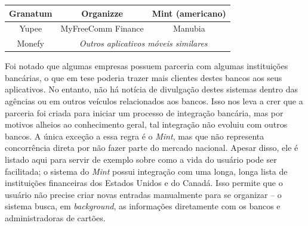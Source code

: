 \documentclass[a4paper]{abnt}
\begin{document}
\begin{center}
	\begin{tabular}{|c|c|c|}
		\hline 
		\textbf{Granatum} & \textbf{Organizz}e & \textbf{Mint (americano)} \\\hline 
		Yupee & MyFreeComm Finance & Manubia \\\hline 
		Monefy & \multicolumn{2}{c|}{\emph{Outros aplicativos móveis similares}} \\\hline 
	\end{tabular}
\end{center}

Foi notado que algumas empresas possuem parceria com algumas instituições bancárias, o que em tese poderia trazer mais clientes destes bancos aos seus aplicativos. No entanto, não há notícia de divulgação destes sistemas dentro das agências ou em outros veículos relacionados aos bancos. Isso nos leva a crer que a parceria foi criada para iniciar um processo de integração bancária, mas por motivos alheios ao conhecimento geral, tal integração não evoluiu com outros bancos. 
A única exceção a essa regra é o \emph{Mint}, mas que não representa concorrência direta por n\~ao fazer parte do mercado nacional. Apesar disso, ele é listado aqui para servir de exemplo sobre como a vida do usuário pode ser facilitada; o sistema do \emph{Mint} possui integração com uma longa, longa lista de instituições financeiras dos Estados Unidos e do Canadá. Isso permite que o usuário não precise criar novas entradas manualmente para se organizar -- o sistema busca, em \emph{background}, as informações diretamente com os bancos e administradoras de cart\~oes.

\end{document}
